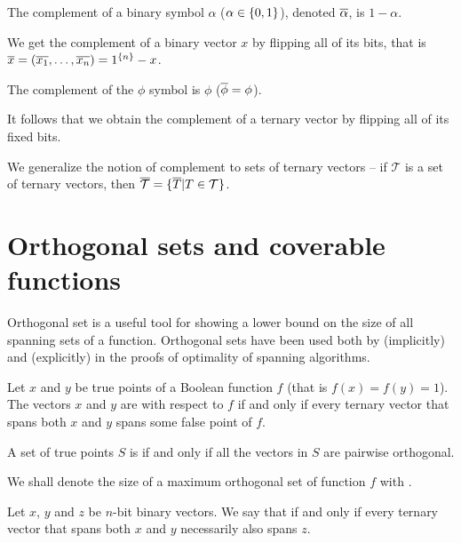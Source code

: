 \begin{definition} %
\label{def:complement}
The complement of a binary symbol $\alpha$
($\alpha \in \{0, 1\}$),
denoted $\overline{\alpha}$,
is $1 - \alpha$.

We get the complement of a binary vector $x$
by flipping all of its bits,
that is $\overline{x}
= (\overline{x_1}, \ldots, \overline{x_n})
= 1^{\{n\}} - x$.

The complement of the $\phi$ symbol is $\phi$
($\overline{\phi} = \phi$).

It follows that
we obtain the complement of a ternary vector
by flipping all of its fixed bits.

We generalize the notion of complement to sets of ternary vectors
-- if $\mathcal{T}$ is a set of ternary vectors,
then $\overline{\mathcal{T}} = \{\overline{T} | T \in \mathcal{T}\}$.
\end{definition}

\section{Orthogonal sets and coverable functions}

Orthogonal set is a useful tool
for showing a lower bound on the size of all spanning sets of a function.
Orthogonal sets have been used both
by \citet{Schieber2005154} (implicitly)
and \citet{Dubovsky2012} (explicitly)
in the proofs of optimality of spanning algorithms.

\begin{definition}
\label{def:orthogonal}
Let $x$ and $y$ be true points of a Boolean function $f$
(that is $f(x) = f(y) = 1$).
The vectors $x$ and $y$ are 
with respect to $f$
if and only if
every ternary vector that spans both $x$ and $y$
spans some false point of $f$.

A set of true points $S$ is 
if and only if
all the vectors in $S$ are pairwise orthogonal.

We shall denote the size of
a maximum orthogonal set
of function $f$
with .
\end{definition}

\begin{definition}
[Collision]
\label{def:collision}
Let $x$, $y$ and $z$ be $n$-bit binary vectors.
We say that 
if and only if
every ternary vector that spans both $x$ and $y$
necessarily also spans $z$.
\end{definition}

